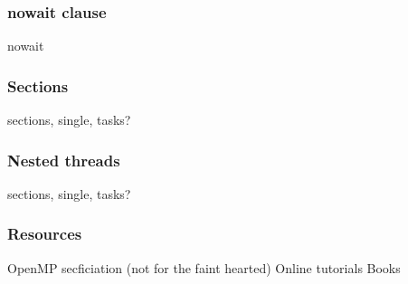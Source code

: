 \documentclass{beamer}
\begin{document}
\begin{frame}
\frametitle{nowait clause}
nowait
\end{frame}

\begin{frame}
\frametitle{Sections}
sections, single, tasks?
\end{frame}

\begin{frame}
\frametitle{Nested threads}
sections, single, tasks?
\end{frame}

\begin{frame}
\frametitle{Resources}
OpenMP secficiation (not for the faint hearted)
Online tutorials
Books
\end{frame}

\end{document}
